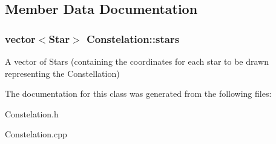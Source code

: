 \subsection{Member Data Documentation}
\hypertarget{class_constelation_a71d208ee2a6b57c32f28044ee7acad55}{
\subsubsection[{stars}]{\setlength{\rightskip}{0pt plus 5cm}vector$<${\bf Star}$>$ Constelation\+::stars}}\label{class_constelation_a71d208ee2a6b57c32f28044ee7acad55}
A vector of Stars (containing the coordinates for each star to be drawn representing the Constellation) 

The documentation for this class was generated from the following files\+:\begin{DoxyCompactItemize}
\item 
Constelation.\+h\item 
Constelation.\+cpp\end{DoxyCompactItemize}
